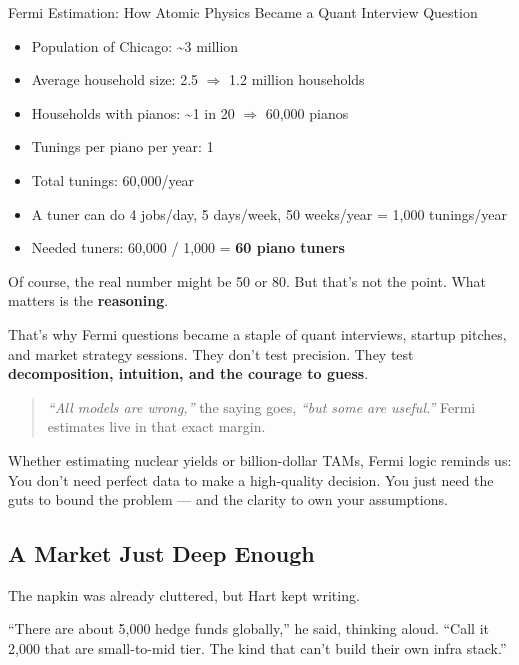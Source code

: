\begin{HistoricalSidebar}{Fermi Estimation: How Atomic Physics Became a Quant Interview Question}
  \medskip
  
  \begin{itemize}
    \item Population of Chicago: \textasciitilde3 million  
    \item Average household size: 2.5 $\Rightarrow$ 1.2 million households  
    \item Households with pianos: \textasciitilde1 in 20 $\Rightarrow$ 60,000 pianos  
    \item Tunings per piano per year: 1  
    \item Total tunings: 60,000/year  
    \item A tuner can do 4 jobs/day, 5 days/week, 50 weeks/year = 1,000 tunings/year  
    \item Needed tuners: 60,000 / 1,000 = \textbf{60 piano tuners}
  \end{itemize}
  
  \medskip
  
  Of course, the real number might be 50 or 80. But that’s not the point.  
  What matters is the \textbf{reasoning}.
  
  \medskip
  
  That’s why Fermi questions became a staple of quant interviews, startup pitches, and market strategy sessions.  
  They don’t test precision.  
  They test \textbf{decomposition, intuition, and the courage to guess}.
  
  \begin{quote}
  \textit{“All models are wrong,”} the saying goes, \textit{“but some are useful.”}  
  Fermi estimates live in that exact margin.
  \end{quote}
  
  \medskip
  
  Whether estimating nuclear yields or billion-dollar TAMs, Fermi logic reminds us:  
  You don’t need perfect data to make a high-quality decision.  
  You just need the guts to bound the problem — and the clarity to own your assumptions.
  
\end{HistoricalSidebar}
  

\subsection{A Market Just Deep Enough}

The napkin was already cluttered, but Hart kept writing.

``There are about 5{,}000 hedge funds globally,'' he said, thinking aloud. ``Call it 2{,}000 
that are small-to-mid tier. The kind that can’t build their own infra stack.''


